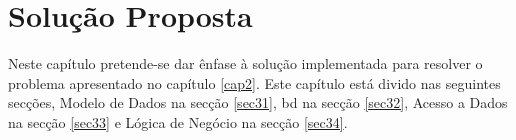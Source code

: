 %
%
\chapter{Solução Proposta} \label{cap3}

Neste capítulo pretende-se dar ênfase à solução implementada para resolver o problema apresentado no capítulo \ref{cap2}. Este capítulo está divido nas seguintes secções, Modelo de Dados na secção \ref{sec31}, \acrlong{bd} na secção \ref{sec32}, Acesso a Dados na secção \ref{sec33} e Lógica de Negócio na secção \ref{sec34}.












